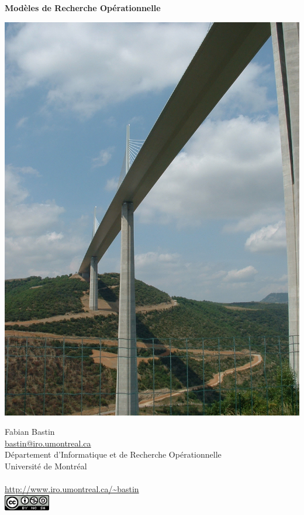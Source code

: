 \documentclass[11pt]{book}%
\theoremstyle{plain}
\numberwithin{equation}{section}
\begin{document}
\shorthandoff{:}

\frontmatter

\thispagestyle{empty}

\begin{center}
{\Huge \bf \sc Modèles de Recherche Opérationnelle}

\mbox{}

\includegraphics[width=0.7\linewidth]{dscf0035.jpg}
		
\mbox{}

{\Large Fabian Bastin}\\
{\normalsize \url{bastin@iro.umontreal.ca}}
\mbox{}\\Département d'Informatique et de Recherche Opérationnelle\\
Université de Montréal\\\mbox{}\\
\url{http://www.iro.umontreal.ca/~bastin}\\
\includegraphics[width=2cm]{cc.png}
\end{center}

\pagebreak{}

\thispagestyle{empty}

\end{document}
